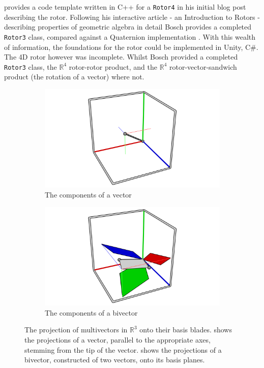 \documentclass{l4proj}
\begin{document}
%
\citet{bosch_4d_2011} provides a code template written in C++ for a \texttt{Rotor4} in his initial blog post describing the rotor. Following his interactive article - an Introduction to Rotors - describing properties of geometric algebra in detail \citep{bosch_lets_nodate} Bosch provides a completed \texttt{Rotor3} class, compared against a Quaternion implementation \citep{bosch_code_nodate}. With this wealth of information, the foundations for the rotor could be implemented in Unity, C\#. The 4D rotor however was incomplete. 
Whilst Bosch provided a completed \texttt{Rotor3} class, the $\mathbb{R}^4$ rotor-rotor product, and the $\mathbb{R}^4$ rotor-vector-sandwich product (the rotation of a vector) where not. 

\begin{figure}
  \begin{subfigure}[b]{0.45\textwidth}
    \includegraphics[width=\textwidth]{images/rotation/projection_vec.png}
    \caption{The components of a vector}
    \label{fig:vec_proj}
  \end{subfigure}
  \begin{subfigure}[b]{0.45\textwidth}
    \includegraphics[width=\textwidth]{images/rotation/projection_biv.png}
    \caption{The components of a bivector}
    \label{fig:bivec_proj}
  \end{subfigure}
  \caption{The projection of multivectors in $\mathbb{R}^3$ onto their basis blades. 
   shows the projections of a vector, parallel to the appropriate axes, stemming from the tip of the vector.
   shows the projections of a bivector, constructed of two vectors, onto its basis planes.}
  \label{fig:projections}
\end{figure}
\end{document}
